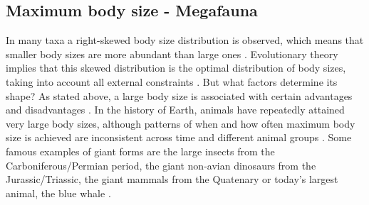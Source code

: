 \subsection{Maximum body size - Megafauna}
In many taxa a right-skewed body size distribution is observed, which means that smaller body sizes are more abundant than large ones \citep{Blackburn1994a,Kozlowski2002,Lyons2008}. 
Evolutionary theory implies that this skewed distribution is the optimal distribution of body sizes, taking into account all external constraints \citep{Smith2009}. But what factors determine its shape?
As stated above, a large body size is associated with certain advantages and disadvantages \citep{Smith2016}.
In the history of Earth, animals have repeatedly attained very large body sizes, although patterns of when and how often maximum body size is achieved are inconsistent across time and different animal groups \citep{Smith2016}.
Some famous examples of giant forms are the large insects from the Carboniferous/Permian period, the giant non-avian dinosaurs from the Jurassic/Triassic, the giant mammals from the Quatenary or today's largest animal, the blue whale \citep{Smith2016}.
